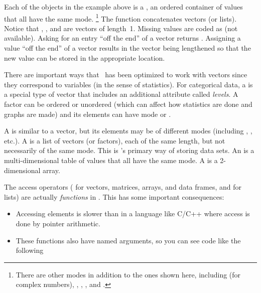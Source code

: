 Each of the objects in the example above is a , an ordered container
of values that all have the same mode.%
\footnote{
There are other modes in addition to the ones shown here, including
 (for complex numbers), 
, , , and .}
The  function concatenates vectors (or lists).
Notice that , , and  are 
vectors of length~1.  Missing values are coded as  (not available).  Asking
for an entry ``off the end'' of a vector returns .
Assigning a value ``off the end'' of a vector results in the vector being
lengthened so that the new value can be stored in the appropriate location.

There are important ways that \R\ has 
been optimized to work with vectors since they correspond to variables 
(in the sense of statistics).
For categorical data, a  is a special type of vector that includes
an additional attribute called \emph{levels}.  
A factor can be ordered or unordered (which can affect how statistics
are done and graphs are made) and its elements can have mode
 or .

A  is similar to a vector, but its elements may be of different 
modes (including , , etc.).
A  is a list of vectors (or factors), 
each of the same length, but not necessarily of the same mode.  
This is \R's primary way of storing data sets.
An  is a multi-dimensional table of values that all have the same 
mode.  A  is a 2-dimensional array.
%

\Rindex{[ ]}%
\Rindex{[[ ]]}%
The access operators (\code{[ ]} for vectors, matrices, arrays, and data frames,
and  \code{[[ ]]} for lists) are actually \emph{functions} in \R.
This has some important consequences:
\begin{itemize}
  \item Accessing elements is slower than in a language like C/C++
  where access is done by pointer arithmetic.
  \item
  These functions also have named arguments, so you can see code like the following
\end{itemize}

